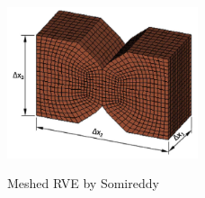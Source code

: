 \begin{figure}[H]
    \centering
    \includegraphics[width=0.5\textwidth]{chapter_2/figures/RVEsomireddy.PNG}
    \caption{Meshed RVE by Somireddy}
    \cite{Somireddy2018DevelopmentFDM}
    \label{fig:Homogenization}
\end{figure}



